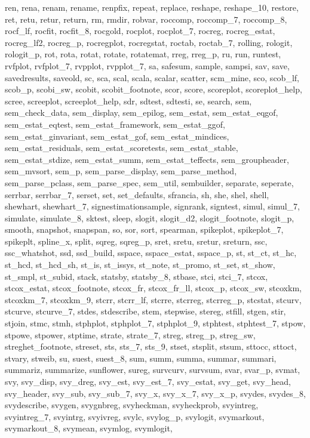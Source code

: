 {{    ren, rena, renam, rename, renpfix, repeat, replace, reshape, reshape_10, restore, ret, retu, retur, return, rm, rmdir, robvar, roccomp, roccomp_7, roccomp_8, rocf_lf, rocfit, rocfit_8, rocgold, rocplot, rocplot_7,
    rocreg, rocreg_estat, rocreg_lf2, rocreg_p, rocregplot, rocregstat, roctab, roctab_7, rolling, rologit, rologit_p, rot, rota, rotat, rotate, rotatemat, rreg, rreg_p, ru, run, runtest, rvfplot, rvfplot_7, rvpplot,
    rvpplot_7, sa, safesum, sample, sampsi, sav, save, savedresults, saveold, sc, sca, scal, scala, scalar, scatter, scm_mine, sco, scob_lf, scob_p, scobi_sw, scobit, scobit_footnote, scor, score, scoreplot,
    scoreplot_help, scree, screeplot, screeplot_help, sdr, sdtest, sdtesti, se, search, sem, sem_check_data, sem_display, sem_epilog, sem_estat, sem_estat_eqgof, sem_estat_eqtest, sem_estat_framework, sem_estat_ggof,
    sem_estat_ginvariant, sem_estat_gof, sem_estat_mindices, sem_estat_residuals, sem_estat_scoretests, sem_estat_stable, sem_estat_stdize, sem_estat_summ, sem_estat_teffects, sem_groupheader, sem_mvsort, sem_p,
    sem_parse_display, sem_parse_method, sem_parse_pclass, sem_parse_spec, sem_util, sembuilder, separate, seperate, serrbar, serrbar_7, serset, set, set_defaults, sfrancia, sh, she, shel, shell, shewhart, shewhart_7,
    signestimationsample, signrank, signtest, simul, simul_7, simulate, simulate_8, sktest, sleep, slogit, slogit_d2, slogit_footnote, slogit_p, smooth, snapshot, snapspan, so, sor, sort, spearman, spikeplot, spikeplot_7,
    spikeplt, spline_x, split, sqreg, sqreg_p, sret, sretu, sretur, sreturn, ssc, ssc_whatshot, ssd, ssd_build, sspace, sspace_estat, sspace_p, st, st_ct, st_hc, st_hcd, st_hcd_sh, st_is, st_issys, st_note, st_promo,
    st_set, st_show, st_smpl, st_subid, stack, statsby, statsby_8, stbase, stci, stci_7, stcox, stcox_estat, stcox_footnote, stcox_fr, stcox_fr_ll, stcox_p, stcox_sw, stcoxkm, stcoxkm_7, stcoxkm_9, stcrr, stcrr_lf,
    stcrre, stcrreg, stcrreg_p, stcstat, stcurv, stcurve, stcurve_7, stdes, stdescribe, stem, stepwise, stereg, stfill, stgen, stir, stjoin, stmc, stmh, stphplot, stphplot_7, stphplot_9, stphtest, stphtest_7, stpow,
    stpowe, stpower, stptime, strate, strate_7, streg, streg_p, streg_sw, streghet_footnote, streset, sts, sts_7, sts_9, stset, stsplit, stsum, sttocc, sttoct, stvary, stweib, su, suest, suest_8, sum, summ, summa, summar,
    summari, summariz, summarize, sunflower, sureg, survcurv, survsum, svar, svar_p, svmat, svy, svy_disp, svy_dreg, svy_est, svy_est_7, svy_estat, svy_get, svy_head, svy_header, svy_sub, svy_sub_7, svy_x, svy_x_7,
    svy_x_p, svydes, svydes_8, svydescribe, svygen, svygnbreg, svyheckman, svyheckprob, svyintreg, svyintreg_7, svyintrg, svyivreg, svylc, svylog_p, svylogit, svymarkout, svymarkout_8, svymean, svymlog, svymlogit,
}}
